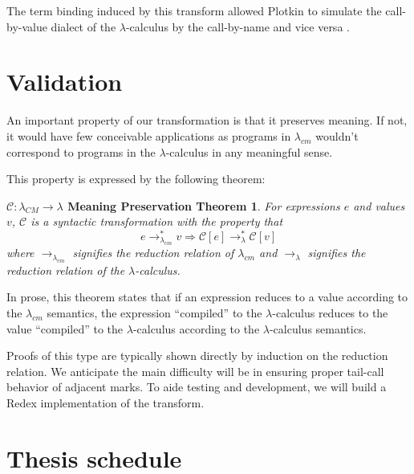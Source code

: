 \documentclass[11pt,ms]{byuprop}
\newtheorem*{cmtheorem}{$\mathcal{C}:\lambda_{CM}\rightarrow\lambda$ Meaning Preservation Theorem}
\begin{document}
The term binding induced by this transform allowed Plotkin to simulate the call-by-value
dialect of the $\lambda$-calculus by the call-by-name and vice versa
\cite{plotkin1975call}.




\section{Validation}

An important property of our transformation is that it preserves meaning. If not, 
it would have few conceivable applications as programs in $\lambda_{cm}$ wouldn't 
correspond to programs in the $\lambda$-calculus in any meaningful sense.

This property is expressed by the following theorem:

\begin{cmtheorem}

For expressions $e$ and values $v$, $\mathcal{C}$ is a syntactic transformation with the 
property that
\[
e\rightarrow^{*}_{\lambda_{cm}}v\Rightarrow \mathcal{C}[e]\rightarrow^{*}_{\lambda}\mathcal{C}[v]
\]
where $\rightarrow_{\lambda_{cm}}$ signifies the reduction relation of $\lambda_{cm}$ 
and $\rightarrow_{\lambda}$ signifies the reduction relation of the $\lambda$-calculus.

\end{cmtheorem}

In prose, this theorem states that if an expression reduces to a value according to 
the $\lambda_{cm}$ semantics, the expression ``compiled'' to the $\lambda$-calculus 
reduces to the value ``compiled'' to the $\lambda$-calculus according to the 
$\lambda$-calculus semantics.

Proofs of this type are typically shown directly by induction on the reduction 
relation. We anticipate the main difficulty will be in ensuring proper tail-call 
behavior of adjacent marks. To aide testing and development, we will build a Redex 
\cite{findler2010redex} implementation of the transform.

\section{Thesis schedule}
\end{document}
